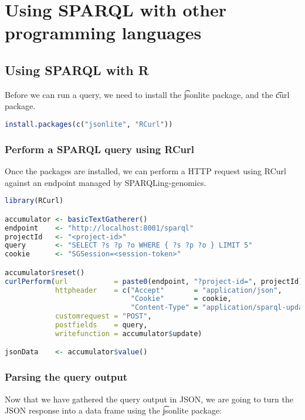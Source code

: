 \chapter{Using SPARQL with other programming languages}
\label{chap:programming}

\section{Using SPARQL with R}

  Before we can run a query, we need to install the \t{jsonlite} package,
  and the \t{curl} package.

\begin{lstlisting}[language=R]
install.packages(c("jsonlite", "RCurl"))
\end{lstlisting}

\subsection{Perform a SPARQL query using RCurl}

  Once the packages are installed, we can perform a HTTP request using RCurl
  against an endpoint managed by SPARQLing-genomics.

\begin{lstlisting}[language=R]
library(RCurl)

accumulator <- basicTextGatherer()
endpoint    <- "http://localhost:8001/sparql"
projectId   <- "<project-id>"
query       <- "SELECT ?s ?p ?o WHERE { ?s ?p ?o } LIMIT 5"
cookie      <- "SGSession=<session-token>"

accumulator$reset()
curlPerform(url           = paste0(endpoint, "?project-id=", projectId),
            httpheader    = c("Accept"       = "application/json",
                              "Cookie"       = cookie,
                              "Content-Type" = "application/sparql-update"),
            customrequest = "POST",
            postfields    = query,
            writefunction = accumulator$update)

jsonData    <- accumulator$value()
\end{lstlisting}

\subsection{Parsing the query output}
  Now that we have gathered the query output in JSON, we are going to turn
  the JSON response into a data frame using the \t{jsonlite} package:

